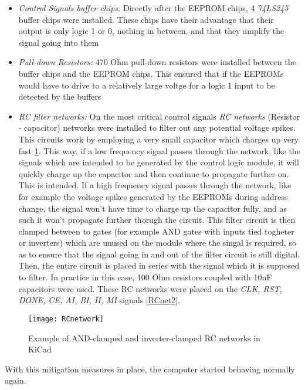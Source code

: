 \begin{itemize}
  \item \emph{Control Signals buffer chips: } Directly after the EEPROM chips, 4 \emph{74LS245}
  \cite{74ls245} buffer chips were installed. These chips have their advantage that their output
  is only logic 1 or 0, nothing in between, and that they amplify the signal going into them
  \item \emph{Pull-down Resistors: } 470 Ohm pull-down resistors were installed between the
  buffer chips and the EEPROM chips. This ensured that if the EEPROMs would have to drive to a
  relatively large voltge for a logic 1 input to be detected by the buffers
  \item \emph{RC filter networks: } On the most critical control signals \emph{RC networks}
  (Resistor - capacitor) networks were installed to filter out any potential voltage spikes.
  This circuits work by employing a very small capacitor which charges up very fast \ref{RCnet1}.
  This way, if a low frequency signal passes through the network, like the signals which are
  intended to be generated by the control logic module, it will quickly charge up the capacitor
  and then continue to propagate further on. This is intended. If a high frequency signal passes
  through the network, like for example the voltage spikes generated by the EEPROMs during address
  change, the signal won't have time to charge up the capacitor fully, and as such it won't
  propagate further thorugh the circuit. This filter circuit is then clamped between to
  gates (for example AND gates with inputs tied togheter or inverters) which are unused on the
  module where the singal is required, so as to ensure that the signal going in and out of the
  filter circuit is still digital. Then, the entire circuit is placed in series with the signal
  which it is supposed to filter. In practice in this case, 100 Ohm  resistors coupled with 10nF
  capacitors were used. These RC networks were placed on the \emph{CLK, RST, DONE, CE, AI, BI,
  II, MI} signals \ref{RCnet2}.
\end{itemize}

\begin{figure}[ht]
  \centering
  \texttt{[image: RCnetwork]}
  \caption{Example of AND-clamped and inverter-clamped RC networks in KiCad}
  \label{RCnet1}
\end{figure}

With this mitigation measures in place, the computer started behaving normally again.
